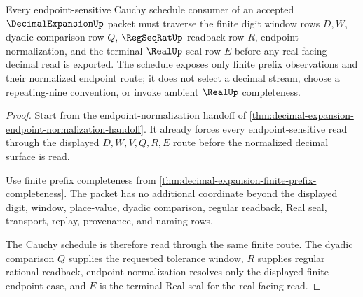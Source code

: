 \begin{theorem}
\label{thm:decimal-expansion-endpoint-cauchy-schedule}
Every endpoint-sensitive Cauchy schedule consumer of an accepted $\DecimalExpansionUp$ packet must traverse the finite digit window rows $D,W$, dyadic comparison row $Q$, $\RegSeqRatUp$ readback row $R$, endpoint normalization, and the terminal $\RealUp$ seal row $E$ before any real-facing decimal read is exported. The schedule exposes only finite prefix observations and their normalized endpoint route; it does not select a decimal stream, choose a repeating-nine convention, or invoke ambient $\RealUp$ completeness.
\end{theorem}
\begin{proof}
Start from the endpoint-normalization handoff of \autoref{thm:decimal-expansion-endpoint-normalization-handoff}. It already forces every endpoint-sensitive read through the displayed $D,W,V,Q,R,E$ route before the normalized decimal surface is read.

Use finite prefix completeness from \autoref{thm:decimal-expansion-finite-prefix-completeness}. The packet has no additional coordinate beyond the displayed digit, window, place-value, dyadic comparison, regular readback, Real seal, transport, replay, provenance, and naming rows.

The Cauchy schedule is therefore read through the same finite route. The dyadic comparison $Q$ supplies the requested tolerance window, $R$ supplies regular rational readback, endpoint normalization resolves only the displayed finite endpoint case, and $E$ is the terminal Real seal for the real-facing read.
\end{proof}

